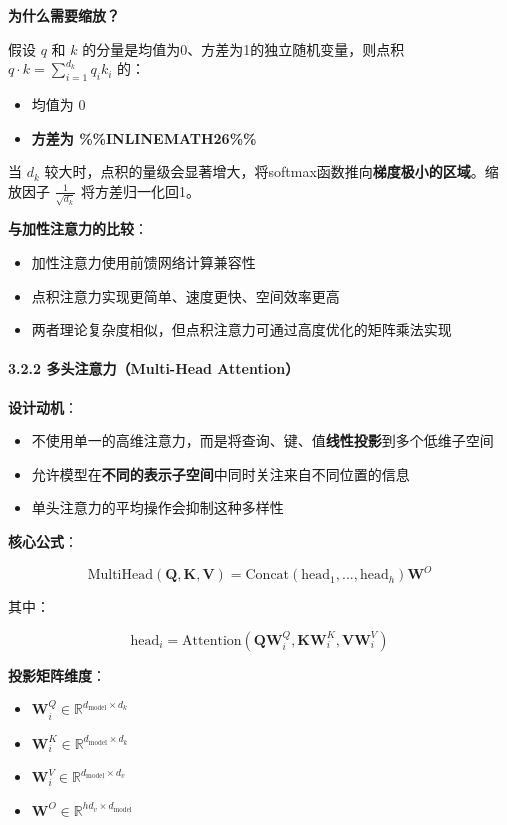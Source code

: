 \documentclass[11pt,a4paper]{article}
\begin{document}
\textbf{为什么需要缩放？}

假设 $q$ 和 $k$ 的分量是均值为0、方差为1的独立随机变量，则点积 $q \cdot k = \sum_{i=1}^{d_k} q_i k_i$ 的：
\begin{itemize}
  \item 均值为 0
  \item \textbf{方差为 \%\%INLINEMATH26\%\%}
\end{itemize}

当 $d_k$ 较大时，点积的量级会显著增大，将softmax函数推向\textbf{梯度极小的区域}。缩放因子 $\frac{1}{\sqrt{d_k}}$ 将方差归一化回1。

\textbf{与加性注意力的比较}：
\begin{itemize}
  \item 加性注意力使用前馈网络计算兼容性
  \item 点积注意力实现更简单、速度更快、空间效率更高
  \item 两者理论复杂度相似，但点积注意力可通过高度优化的矩阵乘法实现
\end{itemize}

\paragraph{3.2.2 多头注意力（Multi-Head Attention）}

\textbf{设计动机}：
\begin{itemize}
  \item 不使用单一的高维注意力，而是将查询、键、值\textbf{线性投影}到多个低维子空间
  \item 允许模型在\textbf{不同的表示子空间}中同时关注来自不同位置的信息
  \item 单头注意力的平均操作会抑制这种多样性
\end{itemize}

\textbf{核心公式}：

\[
\text{MultiHead}(\mathbf{Q}, \mathbf{K}, \mathbf{V}) = \text{Concat}(\text{head}_1, ..., \text{head}_h)\mathbf{W}^O
\]

其中：

\[
\text{head}_i = \text{Attention}(\mathbf{Q}\mathbf{W}_i^Q, \mathbf{K}\mathbf{W}_i^K, \mathbf{V}\mathbf{W}_i^V)
\]

\textbf{投影矩阵维度}：
\begin{itemize}
  \item $\mathbf{W}_i^Q \in \mathbb{R}^{d_{\text{model}} \times d_k}$
  \item $\mathbf{W}_i^K \in \mathbb{R}^{d_{\text{model}} \times d_k}$
  \item $\mathbf{W}_i^V \in \mathbb{R}^{d_{\text{model}} \times d_v}$
  \item $\mathbf{W}^O \in \mathbb{R}^{hd_v \times d_{\text{model}}}$
\end{itemize}
\end{document}
